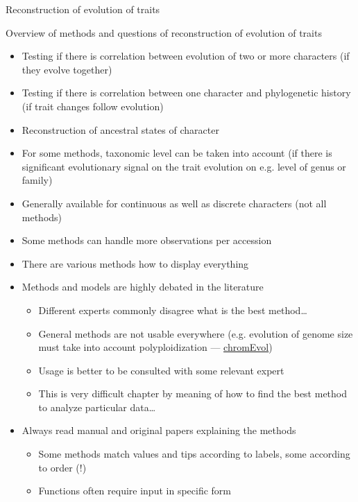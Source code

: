 \documentclass[compress, xelatex, 11pt, xcolor=svgnames, aspectratio=169,
	hyperref={
		bookmarks=true,
		unicode=true,
		colorlinks=true,
		pdftitle={Molecular data in R},
		plainpages=false,
		pdfauthor={Vojtech Zeisek},
		pdfsubject={Course about phylogeny and evolution in R},
		pdfcreator={XeLaTeX},
		pdfkeywords={R, evolution, phylogeny, molecular data},
		linkcolor=Crimson, %
		anchorcolor=Magenta, %
		citecolor=Magenta, %
		filecolor=Magenta, %
		menucolor=Magenta, %
		urlcolor=DodgerBlue, %
		},
	url={hyphens, lowtilde} %
	]{beamer}
\begin{document}
\begin{frame}{Reconstruction of evolution of traits}
	\tableofcontents[currentsection, sectionstyle=show/hide, hideothersubsections]
\end{frame}

\begin{frame}[allowframebreaks]{Overview of methods and questions of reconstruction of evolution of traits}
	\begin{itemize}
		\item Testing if there is correlation between evolution of two or more characters (if they evolve together)
		\item Testing if there is correlation between one character and phylogenetic history (if trait changes follow evolution)
		\item Reconstruction of ancestral states of character
		\item For some methods, taxonomic level can be taken into account (if there is significant evolutionary signal on the trait evolution on e.g. level of genus or family)
		\item Generally available for continuous as well as discrete characters (not all methods)
		\item Some methods can handle more observations per accession
		\item There are various methods how to display everything
		\item Methods and models are highly debated in the literature
		\begin{itemize}
			\item Different experts commonly disagree what is the best method\ldots
			\item General methods are not usable everywhere (e.g. evolution of genome size must take into account polyploidization --- \href{https://github.com/soungalo/chromEvol}{chromEvol})
			\item Usage is better to be consulted with some relevant expert
			\item This is very difficult chapter by meaning of how to find the best method to analyze particular data\ldots
		\end{itemize}
		\item Always read manual and original papers explaining the methods
			\begin{itemize}
				\item Some methods match values and tips according to labels, some according to order (\alert{!})
				\item Functions often require input in specific form
			\end{itemize}
	\end{itemize}
\end{frame}
\end{document}
